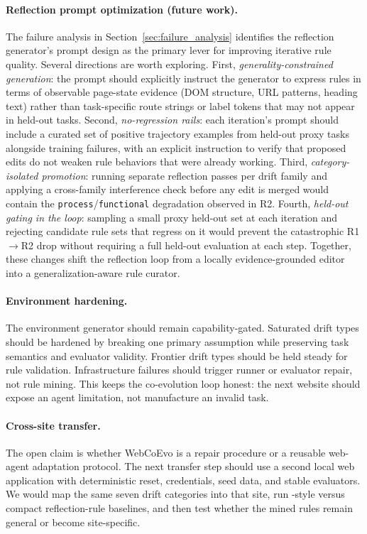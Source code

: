 \paragraph{Reflection prompt optimization (future work).}
The failure analysis in Section~\ref{sec:failure_analysis} identifies the reflection generator's prompt design as the primary lever for improving iterative rule quality. Several directions are worth exploring. First, \emph{generality-constrained generation}: the prompt should explicitly instruct the generator to express rules in terms of observable page-state evidence (DOM structure, URL patterns, heading text) rather than task-specific route strings or label tokens that may not appear in held-out tasks. Second, \emph{no-regression rails}: each iteration's prompt should include a curated set of positive trajectory examples from held-out proxy tasks alongside training failures, with an explicit instruction to verify that proposed edits do not weaken rule behaviors that were already working. Third, \emph{category-isolated promotion}: running separate reflection passes per drift family and applying a cross-family interference check before any edit is merged would contain the \texttt{process}/\texttt{functional} degradation observed in R2. Fourth, \emph{held-out gating in the loop}: sampling a small proxy held-out set at each iteration and rejecting candidate rule sets that regress on it would prevent the catastrophic R1$\to$R2 drop without requiring a full held-out evaluation at each step. Together, these changes shift the reflection loop from a locally evidence-grounded editor into a generalization-aware rule curator.

\paragraph{Environment hardening.}
The environment generator should remain capability-gated. Saturated drift types should be hardened by breaking one primary assumption while preserving task semantics and evaluator validity. Frontier drift types should be held steady for rule validation. Infrastructure failures should trigger runner or evaluator repair, not rule mining. This keeps the co-evolution loop honest: the next website should expose an agent limitation, not manufacture an invalid task.

\paragraph{Cross-site transfer.}
The open claim is whether WebCoEvo is a \linkding{} repair procedure or a reusable web-agent adaptation protocol. The next transfer step should use a second local web application with deterministic reset, credentials, seed data, and stable evaluators. We would map the same seven drift categories into that site, run \expel{}-style versus compact reflection-rule baselines, and then test whether the mined rules remain general or become site-specific.


